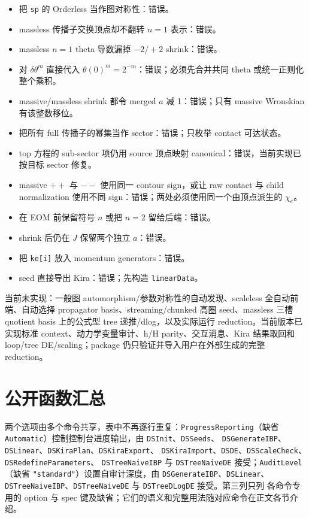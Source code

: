 ﻿\documentclass[a4paper,11pt]{article}
\begin{document}
\begin{itemize}
  \item 把 \texttt{sp} 的 Orderless 当作图对称性：错误。
  \item massless 传播子交换顶点却不翻转 $n=1$ 表示：错误。
  \item massless $n=1$ theta 导数漏掉 $-2/+2$ shrink：错误。
  \item 对 $\delta\theta^m$ 直接代入 $\theta(0)^m=2^{-m}$：错误；必须先合并共同 theta 或统一正则化整个乘积。
  \item massive/massless shrink 都令 merged $a$ 减 1：错误；只有 massive Wronskian 有该整数移位。
  \item 把所有 full 传播子的幂集当作 sector：错误；只枚举 contact 可达状态。
  \item top 方程的 sub-sector 项仍用 source 顶点映射 canonical：错误，当前实现已按目标 sector 修复。
  \item massive $++$ 与 $--$ 使用同一 contour sign，或让 raw contact 与 child normalization 使用不同 sign：错误；两处必须使用同一个由顶点派生的 $\chi_e$。
  \item 在 EOM 前保留符号 $n$ 或把 $n=2$ 留给后端：错误。
  \item shrink 后仍在 $J$ 保留两个独立 $a$：错误。
  \item 把 \texttt{ke[i]} 放入 momentum generators：错误。
  \item seed 直接导出 Kira：错误；先构造 \texttt{linearData}。
\end{itemize}

当前未实现：一般图 automorphism/参数对称性的自动发现、scaleless 全自动前端、自动选择 propagator basis、streaming/chunked 高圈 seed、massless 三槽 quotient basis 上的公式型 tree 递推/dlog，以及实际运行 reduction。当前版本已实现标准 context、动力学变量审计、h/H parity、交互消息、Kira 结果取回和 loop/tree DE/scaling；package 仍只验证并导入用户在外部生成的完整 reduction。

\appendix
\section{公开函数汇总}

两个选项由多个命令共享，表中不再逐行重复：\texttt{ProgressReporting}（缺省
\texttt{Automatic}）控制控制台进度输出，由 \texttt{DSInit}、\allowbreak\texttt{DSSeeds}、\allowbreak
\texttt{DSGenerateIBP}、\allowbreak\texttt{DSLinear}、\allowbreak\texttt{DSKiraPlan}、\allowbreak\texttt{DSKiraExport}、\allowbreak
\texttt{DSKiraImport}、\allowbreak\texttt{DSDE}、\allowbreak\texttt{DSScaleCheck}、\allowbreak\texttt{DSRedefineParameters}、\allowbreak
\texttt{DSTreeNaiveIBP} 与 \texttt{DSTreeNaiveDE} 接受；\texttt{AuditLevel}（缺省
\texttt{"standard"}）设置自审计深度，由 \texttt{DSGenerateIBP}、\allowbreak\texttt{DSLinear}、\allowbreak
\texttt{DSTreeNaiveIBP}、\allowbreak\texttt{DSTreeNaiveDE} 与 \texttt{DSTreeDLogDE} 接受。第三列只列
各命令专用的 option 与 spec 键及缺省；它们的语义和完整用法随对应命令在正文各节介绍。
\end{document}
